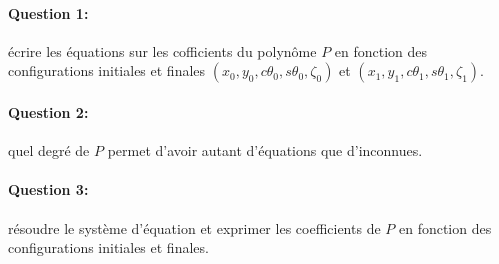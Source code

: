 \documentclass {article}
\begin{document}
\paragraph {Question 1:} écrire les équations sur les cofficients du polyn\^ome $P$ en fonction des configurations initiales et finales $(x_0,y_0,c\theta_0,s\theta_0,\zeta_0)$ et $(x_1,y_1,c\theta_1,s\theta_1,\zeta_1)$.

\paragraph {Question 2:} quel degré de $P$ permet d'avoir autant d'équations que d'inconnues.

\paragraph {Question 3:} résoudre le système d'équation et exprimer les coefficients de $P$ en fonction des configurations initiales et finales.
\end{document}
